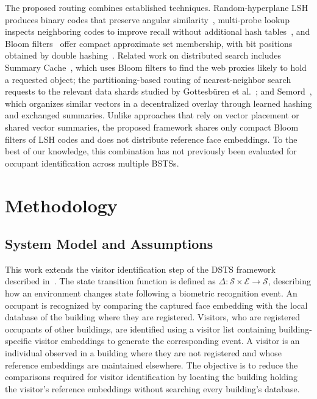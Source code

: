 \documentclass[pdflatex,sn-mathphys-num]{sn-jnl}%
\theoremstyle{thmstyleone}%
\theoremstyle{thmstyletwo}%
\theoremstyle{thmstylethree}%
\begin{document}
The proposed routing combines established techniques. Random-hyperplane LSH produces binary codes that preserve angular similarity~\cite{charikar2002}, multi-probe lookup inspects neighboring codes to improve recall without additional hash tables~\cite{lv2007}, and Bloom filters~\cite{bloom1970} offer compact approximate set membership, with bit positions obtained by double hashing~\cite{kirsch2006}. Related work on distributed search includes Summary Cache~\cite{fan2000}, which uses Bloom filters to find the web proxies likely to hold a requested object; the partitioning-based routing of nearest-neighbor search requests to the relevant data shards studied by Gottesb{\"u}ren et al.~\cite{gottesbueren2024}; and Semord~\cite{wang2026semord}, which organizes similar vectors in a decentralized overlay through learned hashing and exchanged summaries. Unlike approaches that rely on vector placement or shared vector summaries, the proposed framework shares only compact Bloom filters of LSH codes and does not distribute reference face embeddings. To the best of our knowledge, this combination has not previously been evaluated for occupant identification across multiple BSTSs.




\section{Methodology}
\label{sec:methodology}

\subsection{System Model and Assumptions}
\label{subsec:system_model}

This work extends the visitor identification step of the DSTS framework described in~\cite{mohan2020}. The state transition function is defined as $\Delta:\mathcal{S} \times \mathcal{E} \rightarrow \mathcal{S}$, describing how an environment changes state following a biometric recognition event. An occupant is recognized by comparing the captured face embedding with the local database of the building where they are registered. Visitors, who are registered occupants of other buildings, are identified using a visitor list containing building-specific visitor embeddings to generate the corresponding event. A visitor is an individual observed in a building where they are not registered and whose reference embeddings are maintained elsewhere. The objective is to reduce the comparisons required for visitor identification by locating the building holding the visitor's reference embeddings without searching every building's database.
\end{document}
